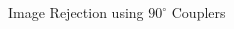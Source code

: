 \documentclass[10pt]{beamer}
\begin{document}
\begin{frame}{Image Rejection using $90^\circ$ Couplers}
\begin{columns}[T]
\begin{column}{.5\textwidth}
    \end{column}
  \end{columns}
\end{frame}
\end{document}

